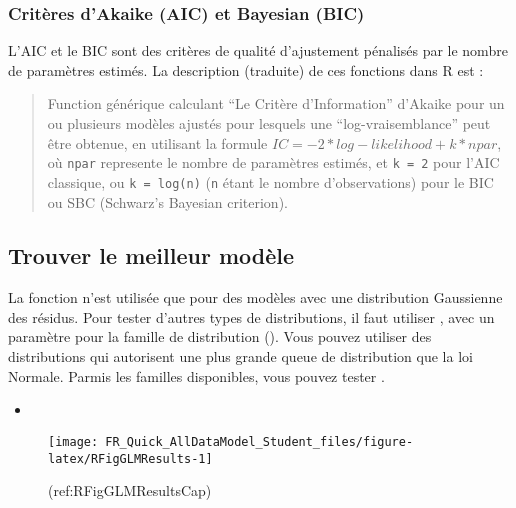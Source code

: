 \documentclass[french,a4paper]{article}
\providecommand{\tightlist}{%
  \setlength{\itemsep}{0pt}\setlength{\parskip}{0pt}}
\begin{document}
\subsubsection{Critères d'Akaike (AIC) et Bayesian
(BIC)}\label{criteres-dakaike-aic-et-bayesian-bic}

L'AIC et le BIC sont des critères de qualité d'ajustement pénalisés par
le nombre de paramètres estimés. La description (traduite) de ces
fonctions dans R est :

\begin{quote}
Function générique calculant ``Le Critère d'Information'' d'Akaike pour
un ou plusieurs modèles ajustés pour lesquels une ``log-vraisemblance''
peut être obtenue, en utilisant la formule
\(IC = -2*log-likelihood + k*npar\), où \texttt{npar} represente le
nombre de paramètres estimés, et \texttt{k\ =\ 2} pour l'AIC classique,
ou \texttt{k\ =\ log(n)} (\texttt{n} étant le nombre d'observations)
pour le BIC ou SBC (Schwarz's Bayesian criterion).
\end{quote}

\subsection{Trouver le meilleur
modèle}\label{trouver-le-meilleur-modele}

La fonction  n'est utilisée que pour des modèles avec
une distribution Gaussienne des résidus. Pour tester d'autres types de
distributions, il faut utiliser , avec un paramètre
pour la famille de distribution (). Vous pouvez
utiliser des distributions qui autorisent une plus grande queue de
distribution que la loi Normale. Parmis les familles disponibles, vous
pouvez tester .

\begin{itemize}
\tightlist
\item
\end{itemize}

\begin{figure}[!h]

{\centering \texttt{[image: FR\_Quick\_AllDataModel\_Student\_files/figure-latex/RFigGLMResults-1]} 

}

\caption{(ref:RFigGLMResultsCap)}\label{fig:RFigGLMResults}
\end{figure}
\end{document}
